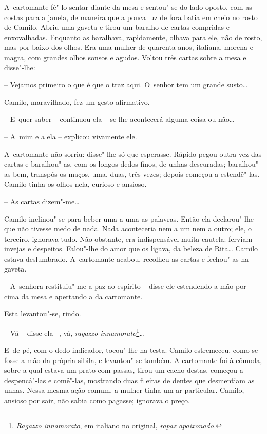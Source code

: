 A~cartomante fê"-lo sentar diante da mesa e sentou"-se do lado oposto, com
as costas para a janela, de maneira que a pouca luz de fora batia em
cheio no rosto de Camilo. Abriu uma gaveta e tirou um baralho de cartas
compridas e enxovalhadas. Enquanto as baralhava, rapidamente, olhava
para ele, não de rosto, mas por baixo dos olhos. Era uma mulher de
quarenta anos, italiana, morena e magra, com grandes olhos sonsos e
agudos. Voltou três cartas sobre a mesa e disse"-lhe:

-- Vejamos primeiro o que é que o traz aqui. O~senhor tem um grande
susto\ldots{}

Camilo, maravilhado, fez um gesto afirmativo.

-- E~quer saber -- continuou ela -- se lhe acontecerá alguma coisa ou
não\ldots{}

-- A~mim e a ela -- explicou vivamente ele.

A~cartomante não sorriu: disse"-lhe só que esperasse. Rápido pegou outra
vez das cartas e baralhou"-as, com os longos dedos finos, de unhas
descuradas; baralhou"-as bem, transpôs os maços, uma, duas, três vezes;
depois começou a estendê"-las. Camilo tinha os olhos nela, curioso e
ansioso.

-- As cartas dizem"-me\ldots{}

Camilo inclinou"-se para beber uma a uma as palavras. Então ela
declarou"-lhe que não tivesse medo de nada. Nada aconteceria nem a um nem
a outro; ele, o terceiro, ignorava tudo. Não obstante, era indispensável
muita cautela: ferviam invejas e despeitos. Falou"-lhe do amor que os
ligava, da beleza de Rita\ldots{} Camilo estava deslumbrado. A~cartomante
acabou, recolheu as cartas e fechou"-as na gaveta.

-- A~senhora restituiu"-me a paz ao espírito -- disse ele estendendo a
mão por cima da mesa e apertando a da cartomante.

Esta levantou"-se, rindo.

-- Vá -- disse ela --, vá, \emph{ragazzo innamorato}\footnote{\emph{Ragazzo
  innamorato}, em italiano no original, \emph{rapaz apaixonado. }}\emph{\ldots{}}

E~de pé, com o dedo indicador, tocou"-lhe na testa. Camilo estremeceu,
como se fosse a mão da própria sibila, e levantou"-se também. A
cartomante foi à cômoda, sobre a qual estava um prato com passas, tirou
um cacho destas, começou a despencá"-las e comê"-las, mostrando duas
fileiras de dentes que desmentiam as unhas. Nessa mesma ação comum, a
mulher tinha um ar particular. Camilo, ansioso por sair, não sabia como
pagasse; ignorava o preço.

